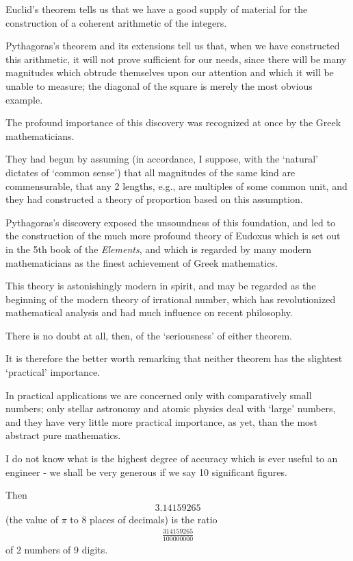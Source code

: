 \documentclass{article}
\numberwithin{equation}{section}
\begin{document}
%
Euclid's theorem tells us that we have a good supply of material for the construction of a coherent arithmetic of the integers.

Pythagoras's theorem and its extensions tell us that, when we have constructed this arithmetic, it will not prove sufficient for our needs, since there will be many magnitudes which obtrude themselves upon our attention and which it will be unable to measure; the diagonal of the square is merely the most obvious example.

%
The profound importance of this discovery was recognized at once by the Greek mathematicians.

They had begun by assuming (in accordance, I suppose, with the `natural' dictates of `common sense') that all magnitudes of the same kind are commensurable, that any 2 lengths, e.g., are multiples of some common unit, and they had constructed a theory of proportion based on this assumption.

Pythagoras's discovery exposed the unsoundness of this foundation, and led to the construction of the much more profound theory of Eudoxus which is set out in the 5th book of the \textit{Elements}, and which is regarded by many modern mathematicians as the finest achievement of Greek mathematics.

This theory is astonishingly modern in spirit, and may be regarded as the beginning of the modern theory of irrational number, which has revolutionized mathematical analysis and had much influence on recent philosophy.

%
There is no doubt at all, then, of the `seriousness' of either theorem.

It is therefore the better worth remarking that neither theorem has the slightest `practical' importance.

In practical applications we are concerned only with comparatively small numbers; only stellar astronomy and atomic physics deal with `large' numbers, and they have very little more practical importance, as yet, than the most abstract pure mathematics.

I do not know what is the highest degree of accuracy which is ever useful to an engineer - we shall be very generous if we say 10 significant figures.

Then
\begin{align*}
    3.14159265
\end{align*}
(the value of $\pi$ to 8 places of decimals) is the ratio
\begin{align*}
    \frac{314159265}{100000000}
\end{align*}
of 2 numbers of 9 digits.
\end{document}
